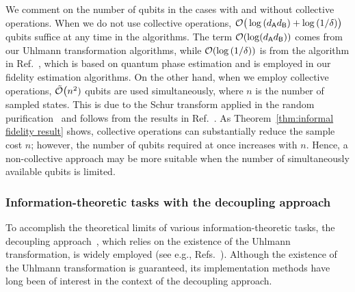 We comment on the number of qubits in the cases with and without collective operations.
When we do not use collective operations, ${\mathcal{O}}\big(\log{(d_{\mathsf{A}}d_{\mathsf{B}})} + \log{(1/\delta)}\big)$ qubits suffice at any time in the algorithms. The term ${\mathcal{O}}(\log(d_{\mathsf{A}} d_{\mathsf{B}}))$ comes from our Uhlmann transformation algorithms, while ${\mathcal{O}}(\log{(1/\delta)})$ is from the algorithm in Ref.~\cite{Wang2024OptimalFidelityPure, wang2024sampleoptimal}, which is based on quantum phase estimation and is employed in our fidelity estimation algorithms.
On the other hand, when we employ collective operations, $\tilde{{\mathcal{O}}}\big(n^2)$ qubits are used simultaneously, where $n$ is the number of sampled states. 
This is due to the Schur transform applied in the random purification~\cite{tang2025conjugatequerieshelp} and follows from the results in Ref.~\cite{burchardt2025highdimensionalschur}.
As Theorem~\ref{thm:informal fidelity result} shows, collective operations can substantially reduce the sample cost $n$; however, the number of qubits required at once increases with $n$. 
Hence, a non-collective approach may be more suitable when the number of simultaneously available qubits is limited.













\subsubsection{Information-theoretic tasks with the decoupling approach}
\label{sec:overview of decoup}


To accomplish the theoretical limits of various information-theoretic tasks, the decoupling approach~\cite{hayden2008decoupling, dupuis2010decoupling, Szehr2013decouple2design, dupuis2014one, preskill2016quantumshannon}, which relies on the existence of the Uhlmann transformation, is widely employed (see e.g., Refs.~\cite{hayden2008decoupling, Abeyesinghe2009Motherfamilytree, Datta2011apexfamilytree}).
Although the existence of the Uhlmann transformation is guaranteed, its implementation methods have long been of interest in the context of the decoupling approach.

